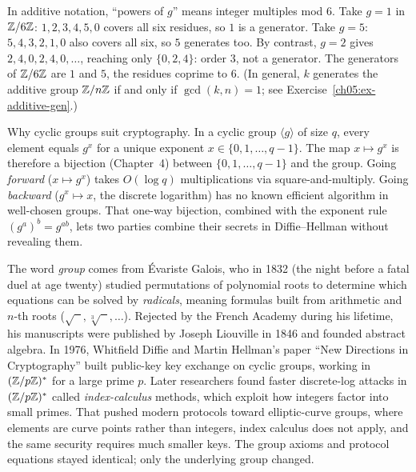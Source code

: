 \begin{example}
\label{ch05:ex-z6-cyclic}
In additive notation, ``powers of $g$'' means integer multiples mod $6$. Take $g=1$ in $\mathbb{Z}/6\mathbb{Z}$:
$1, 2, 3, 4, 5, 0$ covers all six residues, so $1$ is a generator. Take $g=5$: $5, 4, 3, 2, 1, 0$ also covers all
six, so $5$ generates too. By contrast, $g=2$ gives $2, 4, 0, 2, 4, 0, \dots$, reaching only $\{0,2,4\}$: order
$3$, not a generator. The generators of $\mathbb{Z}/6\mathbb{Z}$ are $1$ and $5$, the residues
coprime to $6$. (In general, $k$ generates the additive group $\mathbb{Z}/n\mathbb{Z}$ if and only if $\gcd(k,n)=1$; see Exercise~\ref{ch05:ex-additive-gen}.)
\end{example}

\begin{whybox}
Why cyclic groups suit cryptography. In a cyclic group $\langle g \rangle$ of size
$q$, every element equals $g^x$ for a unique exponent $x \in \{0,1,\dots,q-1\}$. The map $x \mapsto g^x$
is therefore a bijection (Chapter~4) between $\{0,1,\dots,q-1\}$ and the group. Going \emph{forward}
($x \mapsto g^x$) takes $O(\log q)$ multiplications via square-and-multiply. Going
\emph{backward} ($g^x \mapsto x$, the discrete logarithm) has no known efficient
algorithm in well-chosen groups. That one-way bijection, combined with the exponent rule $(g^a)^b = g^{ab}$, lets two
parties combine their secrets in Diffie--Hellman without revealing them.
\end{whybox}

\begin{historybox}
The word \emph{group} comes from \'Evariste Galois, who in 1832 (the night before a fatal duel at age twenty) studied permutations of polynomial roots to determine which equations can be solved by \emph{radicals}, meaning formulas built from arithmetic and $n$-th roots ($\sqrt{\phantom{x}}, \sqrt[3]{\phantom{x}}, \dots$). Rejected by the French Academy during his lifetime, his manuscripts were published by Joseph Liouville in 1846 and founded abstract algebra. In 1976, Whitfield Diffie and Martin Hellman's paper ``New Directions in Cryptography'' built public-key key exchange on cyclic groups, working in $(\mathbb{Z}/p\mathbb{Z})^{*}$ for a large prime $p$. Later researchers found faster discrete-log attacks in $(\mathbb{Z}/p\mathbb{Z})^{*}$ called \emph{index-calculus} methods, which exploit how integers factor into small primes. That pushed modern protocols toward elliptic-curve groups, where elements are curve points rather than integers, index calculus does not apply, and the same security requires much smaller keys. The group axioms and protocol equations stayed identical; only the underlying group changed.
\end{historybox}

